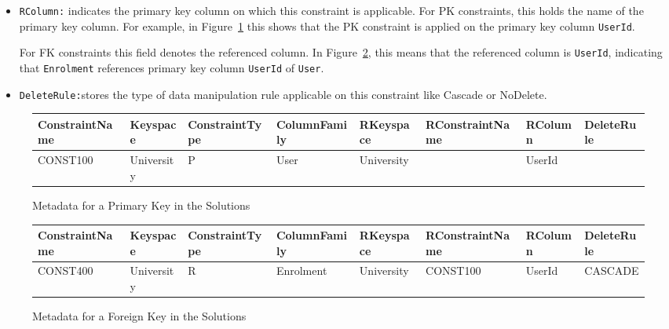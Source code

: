\begin{itemize}
  \item \texttt{RColumn:}  indicates the primary key column on which this
  constraint is applicable.  For \ac{PK} constraints, this holds the name of
  the primary key column.  For example, in Figure~\ref{f:meta-pk} this shows that
  the \ac{PK} constraint is applied on the primary key column \texttt{UserId}. 
  
  For \ac{FK} constraints this field denotes the referenced column.  In
  Figure~\ref{f:meta-fk}, this means that the referenced column is
  \texttt{UserId}, indicating that \texttt{Enrolment} references
  primary key column \texttt{UserId} of \texttt{User}. 
  
  \item \texttt{DeleteRule:}stores the type of data manipulation rule applicable
  on this constraint like Cascade or NoDelete. 
  
\end{itemize}


\begin{figure}[h]
	\centering
	\begin{tabular}{|CCC CCC CC}
		\hline
		\bfseries ConstraintName & \bfseries Keyspace & \bfseries ConstraintType &
		\bfseries ColumnFamily & \bfseries RKeyspace & \bfseries RConstraintName &
		\bfseries RColumn & \bfseries DeleteRule\\
		\hline
		CONST100 & University & P & User & University & & UserId &\\
		\hline
	\end{tabular}
	\caption{Metadata for a Primary Key in the Solutions}\label{f:meta-pk}
\end{figure}


\begin{figure}[h]
	\centering
	\begin{tabular}{|CCC CCC CC}
		\hline
		\bfseries ConstraintName & \bfseries Keyspace & \bfseries ConstraintType &
		\bfseries ColumnFamily & \bfseries RKeyspace & \bfseries RConstraintName &
		\bfseries RColumn & \bfseries DeleteRule\\
		\hline
		CONST400 & University & R & Enrolment & University & CONST100 & UserId &
		CASCADE\\
		\hline
	\end{tabular}
	\caption{ Metadata for a Foreign Key in the Solutions}\label{f:meta-fk}
\end{figure}

